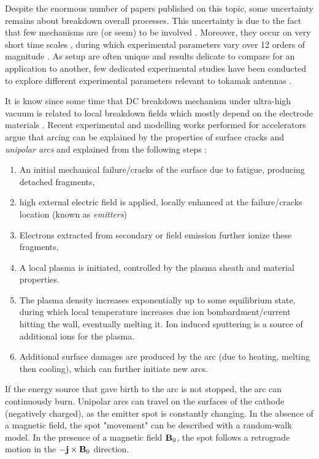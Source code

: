 Despite the enormous number of papers published on this topic, some uncertainty remains about breakdown overall processes. This uncertainty is due to the fact that few mechanisms are (or seem) to be involved . Moreover, they occur on very short time scales , during which experimental parameters vary over 12 orders of magnitude \cite{Timko2011}. As setup are often unique and results delicate to compare for an application to another, few dedicated experimental studies have been conducted to explore different  experimental parameters relevant to tokamak antennas .

It is know since some time that DC breakdown mechanism under ultra-high vacuum is related to local breakdown fields which mostly depend on the electrode materials . Recent experimental and modelling works performed for accelerators argue that arcing can be explained by the properties of surface cracks and \textit{unipolar arcs} and explained from the following steps :
\begin{enumerate}
\item An initial mechanical failure/cracks of the surface due to fatigue, producing detached fragments,
\item high external electric field is applied, locally enhanced at the failure/cracks location (known as \textit{emitters})
\item Electrons extracted from secondary or field emission further ionize these fragments,
\item A local plasma is initiated, controlled by the plasma sheath and material properties. 
\item The plasma density increases exponentially up to some equilibrium state, during which local temperature increases due ion bombardment/current hitting the wall, eventually melting it. Ion induced sputtering is a source of additional ions for the plasma.
\item Additional surface damages are produced by the arc (due to heating, melting then cooling), which can further initiate new arcs.
\end{enumerate}
If the energy source that gave birth to the arc is not stopped, the arc can continuously burn. Unipolar arcs can travel on the surfaces of the cathode (negatively charged), as the emitter spot is constantly changing. In the absence of a magnetic field, the spot "movement" can be described with a random-walk model. In the presence of a magnetic field ${\mathbf B}_0$, the spot follows a retrograde motion in the $-{\mathbf j}\times{\mathbf B}_0$ direction. 

